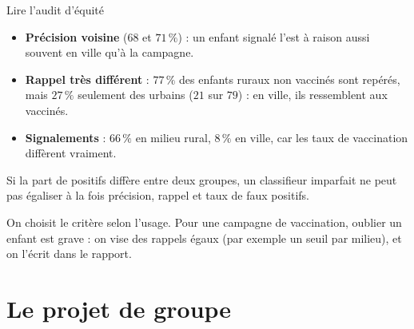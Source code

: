 \documentclass[aspectratio=169,11pt]{beamer}
\begin{document}
\begin{frame}{Lire l'audit d'équité}
  \begin{itemize}\small\setlength\itemsep{1pt}
    \item \textbf{Précision voisine} ($68$ et $71\,\%$) : un enfant signalé l'est à raison aussi souvent en ville qu'à la campagne.
    \item \textbf{Rappel très différent} : $77\,\%$ des enfants ruraux non vaccinés sont repérés, mais $27\,\%$ seulement des urbains ($21$ sur $79$) : en ville, ils ressemblent aux vaccinés.
    \item \textbf{Signalements} : $66\,\%$ en milieu rural, $8\,\%$ en ville, car les taux de vaccination diffèrent vraiment.
  \end{itemize}
  \begin{proposition}[admise]
    Si la part de positifs diffère entre deux groupes, un classifieur imparfait ne peut pas égaliser à la fois précision, rappel et taux de faux positifs.
  \end{proposition}
  \begin{aretenir}
    On choisit le critère selon l'usage. Pour une campagne de vaccination, oublier un enfant est grave : on vise des rappels égaux (par exemple un seuil par milieu), et on l'écrit dans le rapport.
  \end{aretenir}
\end{frame}

\section{Le projet de groupe}
\end{document}
